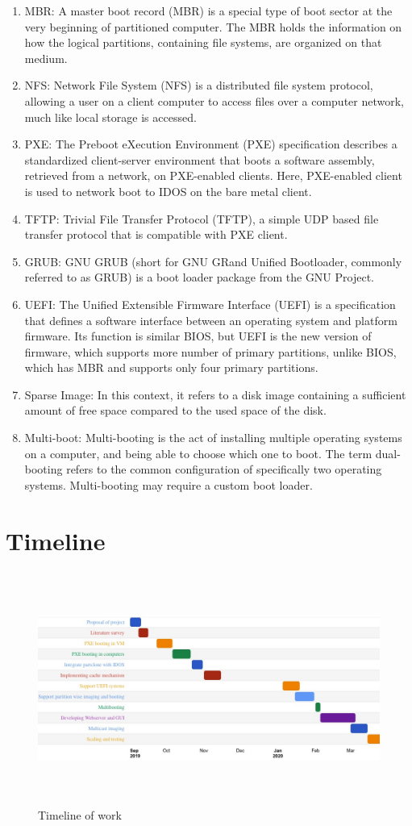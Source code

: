 \documentclass[a4paper,12pt]{article}
\begin{document}
\begin{enumerate}
     \item MBR: A master boot record (MBR) is a special type of boot sector at the very beginning of partitioned computer. The MBR holds the information on how the logical partitions, containing file systems, are organized on that medium.
    \item NFS: Network File System (NFS) is a distributed file system protocol, allowing a user on a client computer to access files over a computer network, much like local storage is accessed.
    \item PXE: The Preboot eXecution Environment (PXE) specification describes a standardized client-server environment that boots a software assembly, retrieved from a network, on PXE-enabled clients. Here, PXE-enabled client is used to network boot to IDOS on the bare metal client.
    \item TFTP: Trivial File Transfer Protocol (TFTP), a simple UDP based file transfer protocol that is compatible with PXE client.
    \item GRUB: GNU GRUB (short for GNU GRand Unified Bootloader, commonly referred to as GRUB) is a boot loader package from the GNU Project. 
    \item UEFI: The Unified Extensible Firmware Interface (UEFI) is a specification that defines a software interface between an operating system and platform firmware. Its function is similar BIOS, but UEFI is the new version of firmware, which supports more number of primary partitions, unlike  BIOS, which has MBR and supports only four primary partitions.
    \item Sparse Image: In this context, it refers to a disk image containing a sufficient amount of free space compared to the used space of the disk.
    \item Multi-boot: Multi-booting is the act of installing multiple operating systems on a computer, and being able to choose which one to boot. The term dual-booting refers to the common configuration of specifically two operating systems. Multi-booting may require a custom boot loader. 
\end{enumerate}
\newpage
\section{\fontsize{16pt}{1em} Timeline}
 \begin{figure}[h!]
    \centering
    \includegraphics[height=3in, width=7in, angle=-90]{timeline.jpeg}
    \caption{Timeline of work}
    \label{timeline}
\end{figure}
\end{document}
